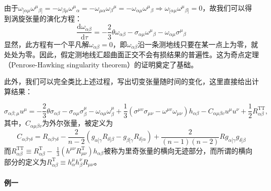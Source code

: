 \documentclass[hyperref, UTF8, a4paper]{ctexart}
\begin{document}
由于$\omega _{[ \alpha \mu } \omega ^{\mu }{}_{\beta ]} =-\omega _{\beta \mu } \omega ^{\mu }{}_{\alpha } =-\omega _{\mu \alpha } \omega {_{\beta }}^{\mu } =-\omega _{\alpha \mu } \omega ^{\mu }{}_{\beta } \Rightarrow \omega _{[ \alpha \mu } \omega ^{\mu }{}_{\beta ]} =0$，故我们可以得到涡旋张量的演化方程：
\begin{equation*}
	\frac{\mathrm{d} \omega _{\alpha \beta }}{\mathrm{d} \tau } =-\frac{2}{3} \theta \omega _{\alpha \beta } -\sigma _{\alpha \mu } \omega ^{\mu }{}_{\beta } -\omega _{\alpha \mu } \sigma ^{\mu }{}_{\beta }
\end{equation*}
显然，此方程有一个平凡解$\omega _{\alpha \beta } =0$，即$\omega _{\alpha \beta }$沿一条测地线只要在某一点上为零，就处处为零。因此，假定测地线汇超曲面正交不会有损结果的普遍性。这为奇点定理（Penrose-Hawking singularity theorem）的证明奠定了基础。



此外，我们可以完全类比上述过程，写出切变张量随时间的变化，这里直接给出计算结果：


\begin{equation*}
	\sigma _{\alpha \beta ;\mu } u^{\mu } =-\frac{2}{3} \theta \sigma _{\alpha \beta } -\sigma _{\alpha \mu } \sigma _{\beta }^{\mu } -\omega _{\alpha \mu } \omega _{\beta }^{\mu } +\frac{1}{3}\left( \sigma ^{\mu v} \sigma _{\mu \nu } -\omega ^{\mu v} \omega _{\mu \nu }\right) h_{\alpha \beta } -C_{\alpha \mu \beta v} u^{\mu } u^{\nu } +\frac{1}{2} R_{\alpha \beta }^{\mathrm{TT}} ,
\end{equation*}
其中，$C_{\alpha \mu \beta v}$为外尔张量，被定义为
\begin{equation*}
	C_{\alpha \beta \gamma \delta } =R_{\alpha \beta \gamma \delta } -\frac{2}{n-2}( g_{\alpha [\gamma } R_{\delta ]\beta } -g_{\beta [\gamma } R_{\delta ]\alpha }) +\frac{2}{(n-1)(n-2)} Rg_{\alpha [\gamma } g_{\delta ]\beta }
\end{equation*}
而$R_{\alpha \beta }^{\mathrm{TT}} \equiv R_{\alpha \beta }^{\mathrm{T}} -$ $\frac{1}{3}\left( h^{\mu \nu } R_{\mu \nu }^{\mathrm{T}}\right) h_{\alpha \beta }$被称为里奇张量的横向无迹部分，而所谓的横向部分的定义为$R_{\alpha \beta }^{\mathrm{T}} \equiv h_{\alpha }^{\mu } h_{\beta }^{\nu } R_{\mu \nu }$。

\paragraph{例一}
\end{document}
